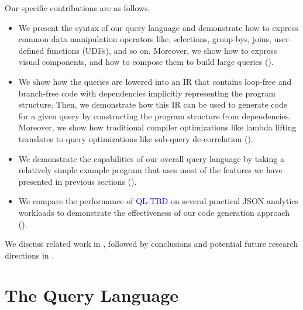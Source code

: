 \documentclass[runningheads]{llncs}
\newcommand{\lang}{\textcolor{blue}{QL-TBD}}
\begin{document}



Our specific contributions are as follows.

\begin{itemize}
    \item We present the syntax of our query language and demonstrate how to express common
          data manipulation operators like, selections, group-bys, joins, user-defined functions (UDFs),
          and so on.
          Moreover, we show how to express visual components, and how to compose them to build
          large queries ().
    \item We show how the queries are lowered into an IR that contains loop-free and branch-free code
          with dependencies implicitly representing the program structure.
          Then, we demonstrate how this IR can be used to generate code for a given query by constructing
          the program structure from dependencies.
          Moreover, we show how traditional compiler optimizations like lambda lifting translates to query
          optimizations like sub-query de-correlation ().
    \item We demonstrate the capabilities of our overall query language by taking a relatively simple example
          program that uses most of the features we have presented in previous sections ().
    \item We compare the performance of \lang{} on several practical JSON analytics workloads to demonstrate the
          effectiveness of our code generation approach ().
\end{itemize}

We discuss related work in , followed by conclusions and potential future research directions
in .


\section{The Query Language}~\label{sec:query_language}
\end{document}
